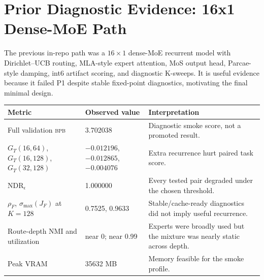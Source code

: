\documentclass[11pt]{article}
\newcommand{\bpb}{\textsc{bpb}}
\begin{document}
\appendix
\section{Prior Diagnostic Evidence: 16x1 Dense-MoE Path}
\label{app:prior}

The previous in-repo path was a \(16\times1\) dense-MoE recurrent model with Dirichlet--UCB routing,
MLA-style expert attention, MoS output head, Parcae-style damping, int6 artifact scoring, and
diagnostic K-sweeps.  It is useful evidence because it failed P1 despite stable fixed-point
diagnostics, motivating the final minimal design.

\begin{center}
\footnotesize
\renewcommand{\arraystretch}{1.12}
\begin{tabularx}{\textwidth}{@{}L{0.35\textwidth} L{0.25\textwidth} L{0.30\textwidth}@{}}
\toprule
\textbf{Metric} & \textbf{Observed value} & \textbf{Interpretation} \\
\midrule
Full validation \bpb{} & 3.702038 & Diagnostic smoke score, not a promoted result. \\
\(G_T(16,64)\), \(G_T(16,128)\), \(G_T(32,128)\) & \(-0.012196\), \(-0.012865\), \(-0.004076\) & Extra recurrence hurt paired task score. \\
\(\mathrm{NDR}_\epsilon\) & 1.000000 & Every tested pair degraded under the chosen threshold. \\
\(\rho_F\), \(\sigma_{\max}(J_F)\) at \(K=128\) & 0.7525, 0.9633 & Stable/cache-ready diagnostics did not imply useful recurrence. \\
Route-depth NMI and utilization & near 0; near 0.99 & Experts were broadly used but the mixture was nearly static across depth. \\
Peak VRAM & 35632 MB & Memory feasible for the smoke profile. \\
\bottomrule
\end{tabularx}
\end{center}
\end{document}
